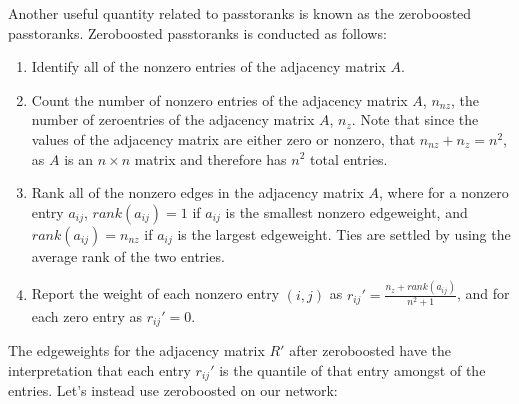 \documentclass[letterpaper,10pt,english]{jupyterBook}
\begin{document}
\sphinxAtStartPar
Another useful quantity related to pass\sphinxhyphen{}to\sphinxhyphen{}ranks is known as the zero\sphinxhyphen{}boosted pass\sphinxhyphen{}to\sphinxhyphen{}ranks. Zero\sphinxhyphen{}boosted pass\sphinxhyphen{}to\sphinxhyphen{}ranks is conducted as follows:
\begin{enumerate}
%
\item {} 
\sphinxAtStartPar
Identify all of the non\sphinxhyphen{}zero entries of the adjacency matrix \(A\).

\item {} 
\sphinxAtStartPar
Count the number of non\sphinxhyphen{}zero entries of the adjacency matrix \(A\), \(n_{nz}\),  the number of zero\sphinxhyphen{}entries of the adjacency matrix \(A\), \(n_z\). Note that since the values of the adjacency matrix are either zero or non\sphinxhyphen{}zero, that \(n_{nz} + n_z = n^2\), as \(A\) is an \(n \times n\) matrix and therefore has \(n^2\) total entries.

\item {} 
\sphinxAtStartPar
Rank all of the non\sphinxhyphen{}zero edges in the adjacency matrix \(A\), where for a non\sphinxhyphen{}zero entry \(a_{ij}\), \(rank(a_{ij}) = 1\) if \(a_{ij}\) is the smallest non\sphinxhyphen{}zero edge\sphinxhyphen{}weight, and \(rank(a_{ij}) = n_{nz}\) if \(a_{ij}\) is the largest edge\sphinxhyphen{}weight. Ties are settled by using the average rank of the two entries.

\item {} 
\sphinxAtStartPar
Report the weight of each non\sphinxhyphen{}zero entry \((i,j)\) as \(r_{ij}' = \frac{n_z + rank(a_{ij})}{n^2 + 1}\), and for each zero entry as \(r_{ij}' = 0\).

\end{enumerate}

\sphinxAtStartPar
The edge\sphinxhyphen{}weights for the adjacency matrix \(R'\) after zero\sphinxhyphen{}boosted  have the interpretation that each entry \(r_{ij}'\) is the quantile of that entry amongst  of the entries. Let’s instead use zero\sphinxhyphen{}boosted  on our network:

\begin{sphinxVerbatim}[commandchars=\\\{\}]
   
\end{sphinxVerbatim}
\end{document}
